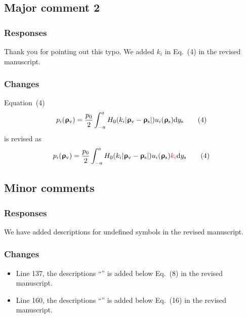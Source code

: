 \documentclass{RebuttalLetter}
\begin{document}
\subsection{Major comment 2}
\begin{commentbox}
    \lipsum[4]
\end{commentbox}

\subsubsection*{Responses}
Thank you for pointing out this typo.
We added $k_i$ in Eq.~(4) in the revised manuscript.

\subsubsection*{Changes}
Equation~(4)
\begin{equation}
    p_i(\bm\uprho_\mathrm{v}) =
    \frac{p_0}{2}
    \int_{-a}^a H_0(k_i\abs{\bm\uprho_\mathrm{v}-\bm\uprho_\mathrm{s}})
    u_i(\bm\uprho_\mathrm{s})
    \dd y_\mathrm{s}
    \tag{4}
\end{equation}
is revised as
\begin{equation}
    p_i(\bm\uprho_\mathrm{v}) =
    \frac{p_0}{2}
    \int_{-a}^a H_0(k_i\abs{\bm\uprho_\mathrm{v}-\bm\uprho_\mathrm{s}})
    u_i(\bm\uprho_\mathrm{s})
    \rev{k_i}
    \dd y_\mathrm{s}
    \tag{4}
\end{equation}


\subsection{Minor comments}
\begin{commentbox}
    \lipsum[5]
\end{commentbox}

\subsubsection*{Responses}
We have added descriptions for undefined symbols in the revised manuscript.

\subsubsection*{Changes}
\begin{itemize}
    \item
          Line 137, the descriptions
          ``''
          is added below Eq.~(8) in the revised manuscript.

    \item
          Line 160, the descriptions
          ``''
          is added below Eq.~(16) in the revised manuscript.
\end{itemize}
\end{document}
